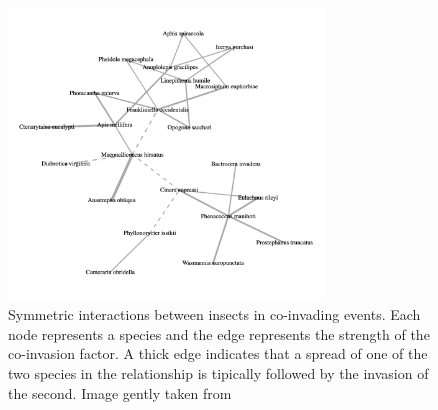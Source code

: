 \documentclass[mscthesis]{usiinfthesis}
\begin{document}

\begin{figure}[H]
    \centering
    \includegraphics[width=0.75\textwidth]{coinvasion.png}
    \caption{Symmetric interactions between insects in co-invading events. Each node represents a species and the edge represents the strength of the co-invasion factor. A thick edge indicates that a spread of one of the two species in the relationship is tipically followed by the invasion of the second. Image gently taken from \cite{intro:ecological}}
    \label{fig:hist_tax_fam}
\end{figure}
\end{document}
